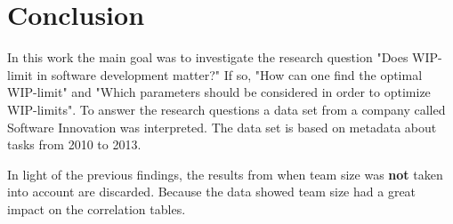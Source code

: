 \documentclass[UKenglish]{ifimaster}  %
\begin{document}

\chapter{Conclusion}
\label{ch:conc}
In this work the main goal was to investigate the research question "Does WIP-limit in software development matter?" If so, "How can one find the optimal WIP-limit" and "Which parameters should be considered in order to optimize WIP-limits".  To answer the research questions a data set from a company called Software Innovation was interpreted. The data set is based on metadata about tasks from 2010 to 2013.

In light of the previous findings, the results from when team size was \textbf{not} taken into account are discarded. Because the data showed team size had a great impact on the correlation tables.
\end{document}
